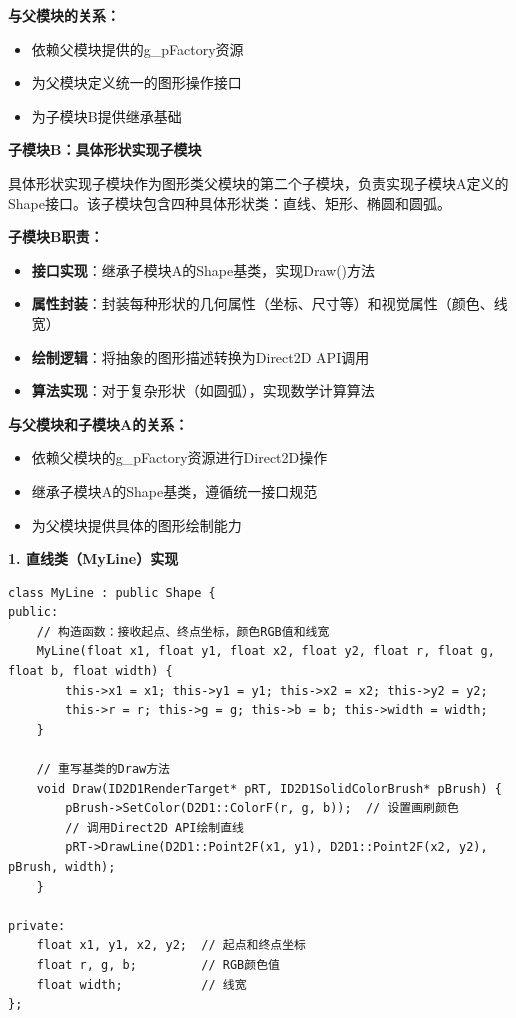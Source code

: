 \documentclass[12pt,a4paper]{article}
\begin{document}
\textbf{与父模块的关系：}
\begin{itemize}
    \item 依赖父模块提供的g\_pFactory资源
    \item 为父模块定义统一的图形操作接口
    \item 为子模块B提供继承基础
\end{itemize}

\textbf{子模块B：具体形状实现子模块}

具体形状实现子模块作为图形类父模块的第二个子模块，负责实现子模块A定义的Shape接口。该子模块包含四种具体形状类：直线、矩形、椭圆和圆弧。

\textbf{子模块B职责：}
\begin{itemize}
    \item \textbf{接口实现}：继承子模块A的Shape基类，实现Draw()方法
    \item \textbf{属性封装}：封装每种形状的几何属性（坐标、尺寸等）和视觉属性（颜色、线宽）
    \item \textbf{绘制逻辑}：将抽象的图形描述转换为Direct2D API调用
    \item \textbf{算法实现}：对于复杂形状（如圆弧），实现数学计算算法
\end{itemize}

\textbf{与父模块和子模块A的关系：}
\begin{itemize}
    \item 依赖父模块的g\_pFactory资源进行Direct2D操作
    \item 继承子模块A的Shape基类，遵循统一接口规范
    \item 为父模块提供具体的图形绘制能力
\end{itemize}

\textbf{1. 直线类（MyLine）实现}

\begin{lstlisting}[caption=直线类实现]
class MyLine : public Shape {
public:
    // 构造函数：接收起点、终点坐标，颜色RGB值和线宽
    MyLine(float x1, float y1, float x2, float y2, float r, float g, float b, float width) {
        this->x1 = x1; this->y1 = y1; this->x2 = x2; this->y2 = y2;
        this->r = r; this->g = g; this->b = b; this->width = width;
    }

    // 重写基类的Draw方法
    void Draw(ID2D1RenderTarget* pRT, ID2D1SolidColorBrush* pBrush) {
        pBrush->SetColor(D2D1::ColorF(r, g, b));  // 设置画刷颜色
        // 调用Direct2D API绘制直线
        pRT->DrawLine(D2D1::Point2F(x1, y1), D2D1::Point2F(x2, y2), pBrush, width);
    }

private:
    float x1, y1, x2, y2;  // 起点和终点坐标
    float r, g, b;         // RGB颜色值
    float width;           // 线宽
};
\end{lstlisting}
\end{document}
